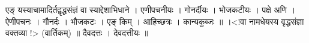 एङ् यस्याचामादिर्तद्वृद्धसंज्ञं वा स्याद्देशाभिधाने । एणीपचनीयः ।
गोनर्दीयः । भोजकटीयः । पक्षे अणि । ऐणीपचनः । गौनर्दः । भौजकटः । एङ् किम्
। आहिच्छत्रः । कान्यकुब्जः ॥ ।\textless{}!वा नामधेयस्य वृद्धसंज्ञा
वक्तव्या !\textgreater{} (वार्तिकम्) ॥ दैवदत्तः । देवदत्तीयः ॥
